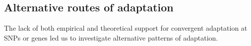 
\subsection*{Alternative routes of adaptation}
The lack of both empirical and theoretical support for convergent adaptation at SNPs or genes led us to investigate alternative patterns of adaptation. 

